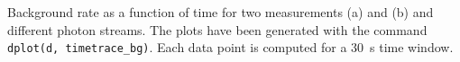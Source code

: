 \label{fig:bg_timetrace} Background rate as a function of time for two measurements (a) and (b) 
and different photon streams. The plots have been generated with the command 
\texttt{dplot(d, timetrace\_bg)}. Each data point is computed for a 30~s time window.